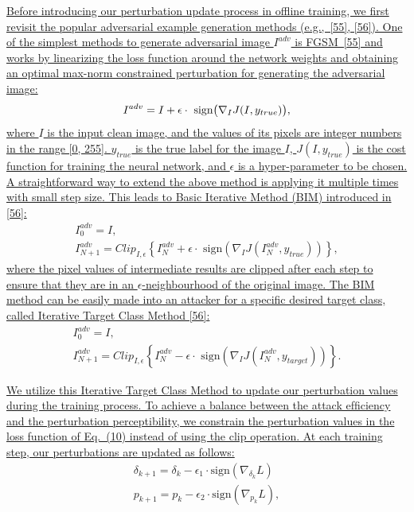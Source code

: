 \documentclass[12pt]{article}
\newcommand{\eg}{e.g.}
\begin{document}
\uline{Before introducing our perturbation update process in offline training, we first revisit the popular adversarial example generation methods (\eg,~[55], [56]). One of the simplest methods to generate adversarial image $I^{adv}$ is FGSM~[55] and works by linearizing the loss function around the network weights and obtaining an optimal max-norm constrained perturbation for generating the adversarial image:}
\begin{equation}
    I^{adv} = I + \epsilon \cdot \text{ sign} \bigl( \nabla_I J(I, y_{true})  \bigr),
    \vspace{-0.1cm}
\end{equation}
\uline{where $I$ is the input clean image, and the values of its pixels are integer numbers in the range [0, 255]. $y_{true}$ is the true label for the image $I$, $J(I, y_{true})$ is the cost function for training the neural network, and $\epsilon$ is a hyper-parameter to be chosen. A straightforward way to extend the above method is applying it multiple times with small step size. This leads to Basic Iterative Method (BIM) introduced in [56]:}
\begin{equation}
    \begin{gathered}
        I_0^{adv} = I, \\
        I_{N+1}^{adv} = Clip_{I, \epsilon}\left\{I_N^{adv}+\epsilon \cdot \text{ sign}(\nabla_I J(I_N^{adv},y_{true}))\right\},
    \end{gathered}
\end{equation}
\uline{where the pixel values of intermediate results are clipped after each step to ensure that they are in
an $\epsilon$-neighbourhood of the original image. The BIM method can be easily made into an attacker for a specific desired target class, called Iterative Target Class Method [56]:}
\begin{equation}
  \begin{gathered}
      I_0^{adv} = I,\\
      I_{N+1}^{adv} = Clip_{I, \epsilon}\left\{I_N^{adv}-\epsilon \cdot \text{ sign}(\nabla_I J(I_N^{adv},y_{target}))\right\}.
  \end{gathered}
\end{equation}

\uline{We utilize this Iterative Target Class Method to update our perturbation values during the training process. To achieve a balance between the attack efﬁciency and the perturbation perceptibility, we constrain the perturbation values in the loss function of Eq.~(10) instead of using the clip operation. At each training step, our perturbations are updated as follows:}
\begin{gather}
\delta_{k+1} = \delta_{k} - \epsilon_1 \cdot \text{sign}(\nabla_{\delta_k}L)\\
p_{k+1} = p_{k} - \epsilon_2 \cdot \text{sign}(\nabla_{p_k}L),
\end{gather}
\end{document}
